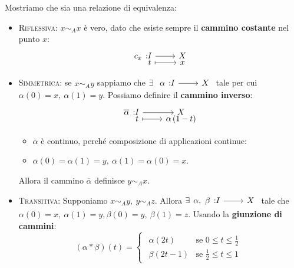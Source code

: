 \begin{demonstration}
	Mostriamo che sia una relazione di equivalenza:
	\begin{itemize}
		\item \textsc{Riflessiva}: $x\sim_A x$ è vero, dato che esiste sempre il \textbf{cammino costante} nel punto $x$: \begin{equation}
			\funztot{c_x}{I}{X}{t}{x}
		\end{equation}
		\item \textsc{Simmetrica}: se $x\sim_A y$ sappiamo che $\exists\ \funz{\alpha}{I}{X}$ tale per cui $\alpha\left(0\right)=x,\ \alpha\left(1\right)=y$. Possiamo definire il \textbf{cammino inverso}:
		\begin{equation}
			\funztot{\overline{\alpha}}{I}{X}{t}{\alpha\left(1-t\right)}
		\end{equation}
	\begin{itemize}
		\item $\overline{\alpha}$ è continuo, perché composizione di applicazioni continue:\\
		\begin{center}
		\end{center}
	\item $\overline{\alpha}\left(0\right)=\alpha\left(1\right)=y,\ \overline{\alpha}\left(1\right)=\alpha\left(0\right)=x$.
	\end{itemize}
Allora il cammino $\overline{\alpha}$ definisce $y\sim_A x$.
		\item \textsc{Transitiva}: Supponiamo $x\sim_A y,\ y\sim_A z$. Allora $\exists \funz{\alpha,\ \beta}{I}{X}$ tale che $\alpha\left(0\right)=x,\ \alpha\left(1\right)=y, \beta\left(0\right)=y,\ \beta\left(1\right)=z$. Usando la \textbf{giunzione di cammini}:
	\begin{equation}
	\left(\alpha\ast\beta\right)\left(t\right)=\begin{cases}
		\begin{array}{lc}
					\alpha\left(2t\right) & \text{se }0\leq t\leq \frac{1}{2}\\
			\beta\left(2t-1\right) & \text{se }\frac{1}{2}\leq t\leq 1	
		\end{array}

\end{cases}
\end{equation}
\end{itemize}
\end{demonstration}
